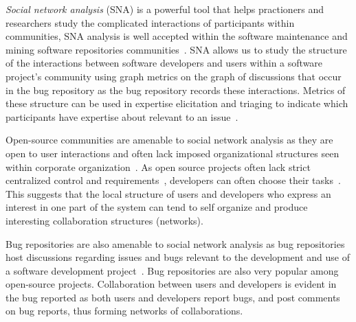 \documentclass[10pt, conference, compsocconf]{IEEEtran}
\begin{document}
\label{introduction}



\emph{Social network analysis} (SNA) is a powerful tool that helps
practioners and researchers study the complicated interactions of
participants within communities, SNA analysis is well accepted within
the software maintenance and mining software repositories
communities~\cite{ACM:chris,MSR:christ,ICSEsocio:meneely}.  
%
SNA allows us to study the structure of the interactions between
software developers and users within a software project's community
using graph metrics on the graph of discussions that occur in the bug
repository as the bug repository records these interactions.
%
Metrics of these structure can be used in expertise elicitation and
triaging to indicate which  participants have expertise about relevant
to an issue~\cite{ICSEsocio:meneely}.


Open-source communities are amenable to social network analysis as
they are
open to user interactions and often lack imposed organizational
structures seen within corporate organization~\cite{ACM:chris}.
As open source projects often lack strict centralized control and
requirements~\cite{AMCIS:Freeh}, developers can often choose their
tasks~\cite{ACM:ashish}. 
This suggests that the local structure of users and developers
who express an interest in one part of the system can tend to self
organize and produce interesting collaboration structures (networks).


Bug repositories are also amenable to social network analysis as bug
repositories host discussions regarding issues and bugs relevant to
the development and use of a software development
project~\cite{ACM:ashish,OSD:yasu}. 
Bug repositories are also very popular among open-source projects.
Collaboration between users and developers is evident in the bug
reported as both users and developers report bugs, and post comments
on bug reports, thus forming networks of collaborations.
\end{document}
